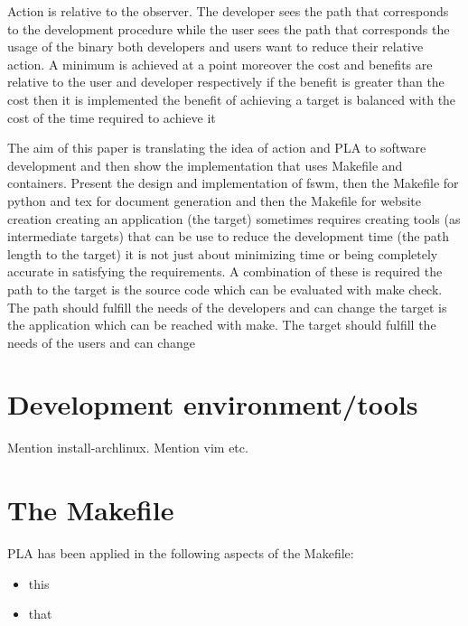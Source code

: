 \documentclass[journal]{IEEEtran}
\begin{document}
Action is relative to the observer.
The developer sees the path that corresponds to the development procedure while the user sees the path that corresponds the usage of the binary
both developers and users want to reduce their relative action. A minimum is achieved at a point
moreover the cost and benefits are relative to the user and developer respectively
if the benefit is greater than the cost then it is implemented
the benefit of achieving a target is balanced with the cost of the time required to achieve it

The aim of this paper is translating the idea of action and PLA to software development and then show the implementation that uses Makefile and containers.
Present the design and implementation of fswm, then the Makefile for python and tex for document generation and then the Makefile for website creation
creating an application (the target) sometimes requires creating tools (as intermediate targets) that can be use to reduce the development time (the path length to the target)
it is not just about minimizing time or being completely accurate in satisfying the requirements. A combination of these is required
the path to the target is the source code which can be evaluated with make check. The path should fulfill the needs of the developers and can change
the target is the application which can be reached with make. The target should fulfill the needs of the users and can change

\section{Development environment/tools}
Mention install-archlinux.
Mention vim etc.

\section{The Makefile}
PLA has been applied in the following aspects of the Makefile:
\begin{itemize}
	\item this
	\item that
\end{itemize}
\end{document}
